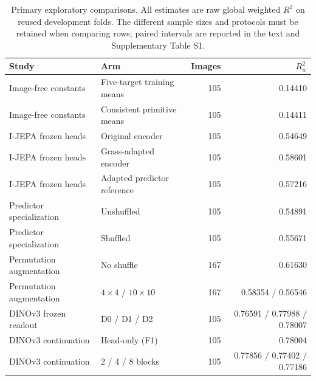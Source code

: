 \documentclass[pdflatex,a4paper,sn-nature]{sn-jnl}
\begin{document}
\begin{table}[ht]
\centering
\caption{Primary exploratory comparisons. All estimates are raw global weighted $R^2$ on reused development folds. The different sample sizes and protocols must be retained when comparing rows; paired intervals are reported in the text and Supplementary Table S1.}
\label{tab:comparisons}
\begin{tabular}{llrr}
\toprule Study & Arm & Images & $R_w^2$ \\
\midrule
Image-free constants & Five-target training means & 105 & 0.14410 \\
Image-free constants & Consistent primitive means & 105 & 0.14411 \\
I-JEPA frozen heads & Original encoder & 105 & 0.54649 \\
I-JEPA frozen heads & Grass-adapted encoder & 105 & 0.58601 \\
I-JEPA frozen heads & Adapted predictor reference & 105 & 0.57216 \\
Predictor specialization & Unshuffled & 105 & 0.54891 \\
Predictor specialization & Shuffled & 105 & 0.55671 \\
Permutation augmentation & No shuffle & 167 & 0.61630 \\
Permutation augmentation & $4\times4$ / $10\times10$ & 167 & 0.58354 / 0.56546 \\
DINOv3 frozen readout & D0 / D1 / D2 & 105 & 0.76591 / 0.77988 / 0.78007 \\
DINOv3 continuation & Head-only (F1) & 105 & 0.78004 \\
DINOv3 continuation & 2 / 4 / 8 blocks & 105 & 0.77856 / 0.77402 / 0.77186 \\
\bottomrule
\end{tabular}
\end{table}
\end{document}
